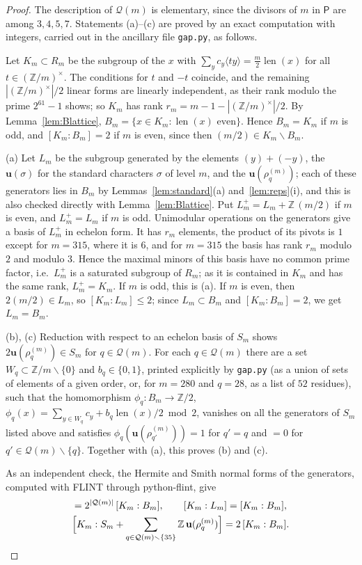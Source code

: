\documentclass[11pt]{amsart}
\theoremstyle{definition}
\theoremstyle{remark}
\numberwithin{equation}{section}
\newcommand{\Z}{\mathbb{Z}}
\newcommand{\cQ}{\mathcal{Q}}
\newcommand{\sP}{\mathsf{P}}
\newcommand{\uu}{\mathbf{u}}
\newcommand{\len}{\operatorname{len}}
\newcommand{\sm}{\smallsetminus}
\begin{document}
\begin{proof}
The description of $\cQ(m)$ is elementary, since the divisors of $m$ in $\sP$ are among $3,4,5,7$. Statements (a)--(c) are proved by an exact computation with integers, carried out in the ancillary file \texttt{gap.py}, as follows.

Let $K_m\subset R_m$ be the subgroup of the $x$ with $\sum_yc_y\langle ty\rangle=\frac m2\len(x)$ for all $t\in(\Z/m)^\times$. The conditions for $t$ and $-t$ coincide, and the remaining $|(\Z/m)^\times|/2$ linear forms are linearly independent, as their rank modulo the prime $2^{61}-1$ shows; so $K_m$ has rank $r_m=m-1-|(\Z/m)^\times|/2$. By Lemma~\ref{lem:Blattice}, $B_m=\{x\in K_m:\len(x)\text{ even}\}$. Hence $B_m=K_m$ if $m$ is odd, and $[K_m:B_m]=2$ if $m$ is even, since then $(m/2)\in K_m\sm B_m$.

(a) Let $L_m$ be the subgroup generated by the elements $(y)+(-y)$, the $\uu(\sigma)$ for the standard characters $\sigma$ of level $m$, and the $\uu(\rho^{(m)}_q)$; each of these generators lies in $B_m$ by Lemmas~\ref{lem:standard}(a) and~\ref{lem:reps}(i), and this is also checked directly with Lemma~\ref{lem:Blattice}. Put $L^+_m=L_m+\Z\,(m/2)$ if $m$ is even, and $L^+_m=L_m$ if $m$ is odd. Unimodular operations on the generators give a basis of $L^+_m$ in echelon form. It has $r_m$ elements, the product of its pivots is $1$ except for $m=315$, where it is $6$, and for $m=315$ the basis has rank $r_m$ modulo $2$ and modulo $3$. Hence the maximal minors of this basis have no common prime factor, i.e.\ $L^+_m$ is a saturated subgroup of $R_m$; as it is contained in $K_m$ and has the same rank, $L^+_m=K_m$. If $m$ is odd, this is (a). If $m$ is even, then $2(m/2)\in L_m$, so $[K_m:L_m]\le2$; since $L_m\subset B_m$ and $[K_m:B_m]=2$, we get $L_m=B_m$.

(b), (c) Reduction with respect to an echelon basis of $S_m$ shows $2\uu(\rho^{(m)}_q)\in S_m$ for $q\in\cQ(m)$. For each $q\in\cQ(m)$ there are a set $W_q\subset\Z/m\sm\{0\}$ and $b_q\in\{0,1\}$, printed explicitly by \texttt{gap.py} (as a union of sets of elements of a given order, or, for $m=280$ and $q=28$, as a list of $52$ residues), such that the homomorphism $\phi_q\colon B_m\to\Z/2$, $\phi_q(x)=\sum_{y\in W_q}c_y+b_q\len(x)/2\bmod 2$, vanishes on all the generators of $S_m$ listed above and satisfies $\phi_q(\uu(\rho^{(m)}_{q'}))=1$ for $q'=q$ and $=0$ for $q'\in\cQ(m)\sm\{q\}$. Together with (a), this proves (b) and (c).

As an independent check, the Hermite and Smith normal forms of the generators, computed with FLINT \cite{FLINT} through python-flint, give
\begin{gather*}
[K_m:S_m]=2^{|\cQ(m)|}\,[K_m:B_m],\qquad [K_m:L_m]=[K_m:B_m],\\
\Bigl[K_m:S_m+\sum_{q\in\cQ(m)\sm\{35\}}\Z\,\uu(\rho^{(m)}_q)\Bigr]=2\,[K_m:B_m].
\end{gather*}
\end{proof}
\end{document}
